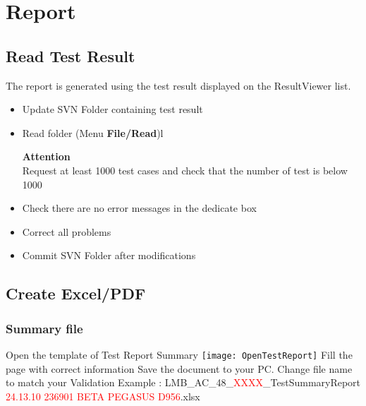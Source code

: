 \chapter{Report}



\section{Read Test Result} 
The report is generated using the test result displayed on the ResultViewer list.
\begin{itemize}  
\item Update SVN Folder containing test result
\item Read folder (Menu \textbf{File/Read})l
 \begin{tcolorbox}[colframe=white!100!black, colback=red!50!white, sharp corners=all]
 \textbf{Attention}\\
Request at least 1000 test cases and check that the number of test is below 1000
\end{tcolorbox}
\item Check there are no error messages in the dedicate box
\item Correct all problems
\item Commit SVN Folder after modifications
\end{itemize}

\clearpage


\section{Create Excel/PDF}




\subsection{Summary file}
Open the template of Test Report Summary\newline
\texttt{[image: OpenTestReport]}
\newline
\newline
Fill the page with correct information\newline
Save the document to your PC. Change file name to match your Validation\newline
Example : LMB\_AC\_48\_\textcolor{red}{XXXX}\_TestSummaryReport \textcolor{red}{24.13.10 236901 BETA PEGASUS D956}.xlsx\newline
\newline






